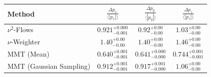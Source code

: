     \begin{tabular}{lccc}
        \toprule
        Method & $\frac{\Delta p_x}{\langle |p_x|\rangle}$ & $\frac{\Delta p_y}{\langle |p_y|\rangle}$ & $\frac{\Delta p_z}{\langle |p_z|\rangle}$ \\
        \midrule
        $\nu^2$-Flows & $0.921_{-0.001}^{+0.000}$ & $0.92_{-0.00}^{+0.00}$ & $1.03_{-0.00}^{+0.00}$ \\
        $\nu$-Weighter & $1.40_{-0.00}^{+0.00}$ & $1.40_{-0.00}^{+0.00}$ & $1.46_{-0.00}^{+0.00}$ \\
        MMT (Mean) & $0.640_{-0.001}^{+0.001}$ & $0.641_{-0.000}^{+0.000}$ & $0.744_{-0.001}^{+0.001}$ \\
        MMT (Gaussian Sampling) & $0.912_{-0.001}^{+0.001}$ & $0.917_{-0.000}^{+0.001}$ & $1.06_{-0.00}^{+0.00}$ \\
        \bottomrule
    \end{tabular}